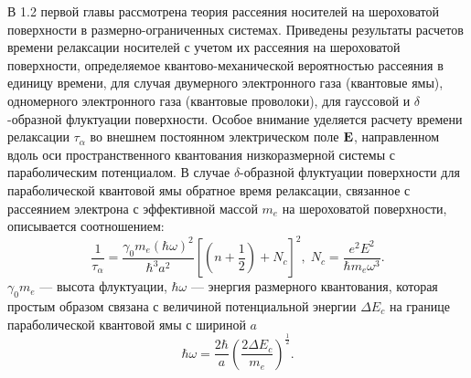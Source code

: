 В 1.2 первой главы рассмотрена теория рассеяния носителей на шероховатой поверхности в размерно-ограниченных системах. Приведены результаты расчетов времени релаксации носителей с учетом их рассеяния на шероховатой поверхности, определяемое квантово-механической вероятностью рассеяния в единицу времени, для случая двумерного электронного газа (квантовые ямы), одномерного электронного газа (квантовые проволоки), для гауссовой и $\delta$-образной флуктуации поверхности. Особое внимание уделяется расчету времени релаксации $\tau_\alpha$ во внешнем постоянном электрическом поле $\boldsymbol{\mathbf{E}}$, направленном вдоль оси пространственного квантования низкоразмерной системы с параболическим потенциалом.
В случае $\delta$-образной флуктуации поверхности для параболической квантовой ямы обратное время релаксации, связанное с рассеянием электрона с эффективной массой $m_e$ на шероховатой поверхности, описывается соотношением: 
\begin{equation} \label{eq:syn_01}
\frac{1}{\tau _{\alpha } } =\frac{\gamma_0 m_e (\hbar\omega)^2 }{\hbar^3 a^2 } \left[\left(n+\frac{1}{2} \right)+N_c \right]^2, \;
N_c =\frac{e^2 E^2 }{\hbar m_e \omega^3 } .
\end{equation}  
$\gamma_0 m_e$ --- высота флуктуации, $\hbar\omega$ --- энергия размерного квантования, которая простым образом связана с величиной потенциальной энергии $\Delta E_c$ на границе параболической квантовой ямы с шириной $a$
\[
\hbar\omega = \frac{2\hbar}{a}\left(  \frac{2\Delta E_c}{m_e} \right)^{\frac{1}{2}}.
\]

